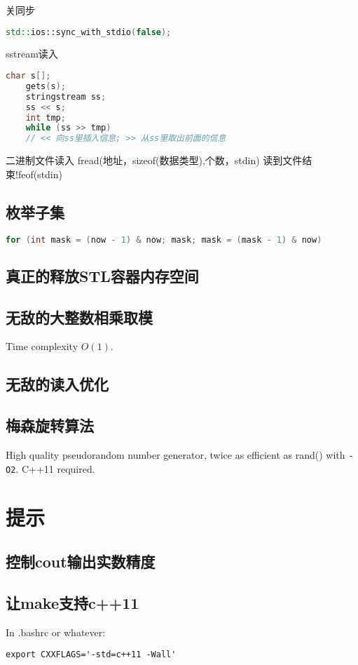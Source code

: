 \documentclass[landscape,a4paper]{article}
\begin{document}
\begin{spacing}{0.3}
\begin{multicols}{2}
关同步
\begin{lstlisting}[language=C++]
    std::ios::sync_with_stdio(false);
\end{lstlisting}

sstream读入
\begin{lstlisting}[language=C++]
    char s[];
    gets(s);
    stringstream ss;
    ss << s;
    int tmp;
    while (ss >> tmp)
    // << 向ss里插入信息; >> 从ss里取出前面的信息
\end{lstlisting}

二进制文件读入
	fread(地址，sizeof(数据类型),个数，stdin) 读到文件结束!feof(stdin)
\subsection{枚举子集}
\begin{lstlisting}[language=C++]
	for (int mask = (now - 1) & now; mask; mask = (mask - 1) & now)
\end{lstlisting}
\subsection{真正的释放STL容器内存空间}

\subsection{无敌的大整数相乘取模}
Time complexity $O(1)$.

\subsection{无敌的读入优化}

\subsection{梅森旋转算法}
High quality pseudorandom number generator, twice as efficient as rand() with \texttt{-O2}.
C++11 required.


\section{提示}

\subsection{控制cout输出实数精度}

\subsection{让make支持c++11}
In .bashrc or whatever:
\begin{verbatim}
export CXXFLAGS='-std=c++11 -Wall'
\end{verbatim}


\end{multicols}
\end{spacing}
\end{document}

